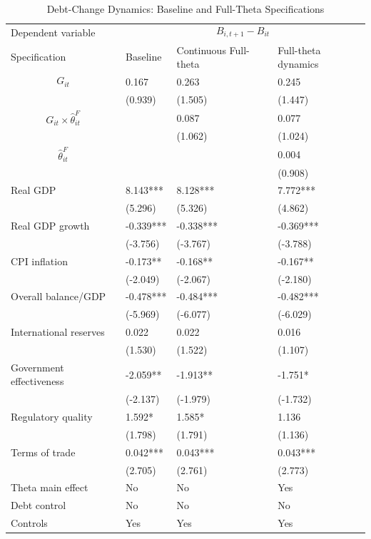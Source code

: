 \begin{table}[H]\centering
\begin{threeparttable}
\caption{Debt-Change Dynamics: Baseline and Full-Theta Specifications}
\label{tab:debt_change_combined_fulltheta}
\scriptsize
\begin{tabularx}{\textwidth}{lYYY}
\toprule
Dependent variable &  \\
\cmidrule(lr){2-4}
Specification & Baseline & Continuous Full-theta & Full-theta dynamics \\
\midrule
$$G_{it}$$ & 0.167 & 0.263 & 0.245 \\
 & (0.939) & (1.505) & (1.447) \\
$$G_{it}\times\widehat{\theta}^{F}_{it}$$ &  & 0.087 & 0.077 \\
 &  & (1.062) & (1.024) \\
$$\widehat{\theta}^{F}_{it}$$ &  &  & 0.004 \\
 &  &  & (0.908) \\
Real GDP & 8.143*** & 8.128*** & 7.772*** \\
 & (5.296) & (5.326) & (4.862) \\
Real GDP growth & -0.339*** & -0.338*** & -0.369*** \\
 & (-3.756) & (-3.767) & (-3.788) \\
CPI inflation & -0.173** & -0.168** & -0.167** \\
 & (-2.049) & (-2.067) & (-2.180) \\
Overall balance/GDP & -0.478*** & -0.484*** & -0.482*** \\
 & (-5.969) & (-6.077) & (-6.029) \\
International reserves & 0.022 & 0.022 & 0.016 \\
 & (1.530) & (1.522) & (1.107) \\
Government effectiveness & -2.059** & -1.913** & -1.751* \\
 & (-2.137) & (-1.979) & (-1.732) \\
Regulatory quality & 1.592* & 1.585* & 1.136 \\
 & (1.798) & (1.791) & (1.136) \\
Terms of trade & 0.042*** & 0.043*** & 0.043*** \\
 & (2.705) & (2.761) & (2.773) \\
\midrule
Theta main effect & No & No & Yes \\
Debt control & No & No & No \\
Controls & Yes & Yes & Yes \\

\end{tabularx}
\end{threeparttable}
\end{table}
